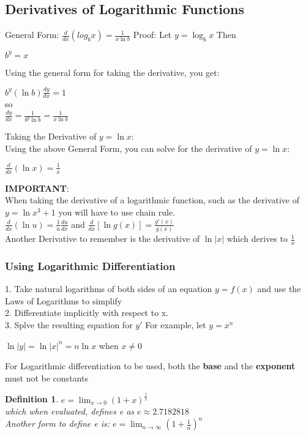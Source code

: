 \documentclass[10pt,a4paper]{article}
\newtheorem{definition}{Definition}
\begin{document}
	\subsection{Derivatives of Logarithmic Functions}
		General Form: $\frac{d}{dx}(log_{b}{x}) = \frac{1}{x\ln{b}}$
		Proof: Let $y=\log_{b}{x}$ Then
		\begin{center}
			$b^{y}=x$
		\end{center}
		Using the general form for taking the derivative, you get:
		\begin{center}
			$b^{y}(\ln{b})\frac{dy}{dx}=1$
			\\so
			\\$\frac{dy}{dx}=\frac{1}{b^{y}\ln{b}} = \frac{1}{x\ln{b}}$
		\end{center}
		Taking the Derivative of $y=\ln{x}$:
		\\Using the above General Form, you can solve for the derivative of $y=\ln{x}$:
		\begin{center}
			$\frac{d}{dx}(\ln{x})=\frac{1}{x}$
		\end{center}
		\textbf{IMPORTANT}:
		\\When taking the derivative of a logarithmic function, such as the derivative of $y=\ln{x^{3}+1}$ you will have to use chain rule.
		\\$\frac{d}{dx}(\ln{u}) = \frac{1}{u}\frac{du}{dx}$ and $\frac{d}{dx}[\ln{g(x)}] = \frac{g'(x)}{g(x)}$
		\\Another Derivative to remember is the derivative of $\ln|x|$ which derives to $\frac{1}{x}$
		\subsubsection{Using Logarithmic Differentiation}
		1. Take natural logarithms of both sides of an equation $y=f(x)$ and use the Laws of Logarithms to simplify
		\\2. Differentiate implicitly with respect to x.
		\\3. Splve the resulting equation for $y'$
		For example, let $y=x^{n}$
		\begin{center}
			$\ln{|y|} = \ln{|x|^{n}}=n\ln{x}$ when $x \neq 0$
		\end{center}
		For Logarithmic differentiation to be used, both the \textbf{base} and the \textbf{exponent} must not be constants
		\begin{definition}
			$e=\lim_{x\rightarrow 0}{(1+x)^{\frac{1}{x}}}$ 
			\\which when evaluated, defines e as $e\approx 2.7182818$
			\\Another form to define e is: 
			$e=\lim_{n\rightarrow\infty}{(1+\frac{1}{n})^{n}}$
		\end{definition}
\end{document}
